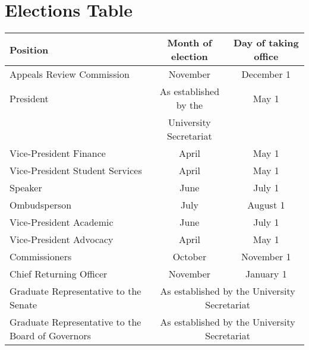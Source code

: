 \section{Elections Table}

\begin{center}
    \begin{tabular}{ l |c   c }

    Position & Month of election & Day of taking office \\  \hline
    Appeals Review Commission & November & December 1\\ 
    President & As established by the & May 1\\
     & University Secretariat & \\
    Vice-President Finance  & April & May 1 \\ 
    Vice-President Student Services & April & May 1 \\ 
    Speaker & June & July 1 \\ 
    Ombudsperson & July & August 1\\
    Vice-President Academic & June & July 1 \\ 
    Vice-President Advocacy & April & May 1 \\ 
    Commissioners & October & November  1 \\ 
    Chief Returning Officer & November & January 1 \\ 
    Graduate Representative to the Senate &\multicolumn{2}{c}{As established by the University Secretariat}\\
	Graduate Representative to the Board of Governors  &\multicolumn{2}{c}{As established by the University Secretariat}\\	
\end{tabular}
\end{center}


\newpage

